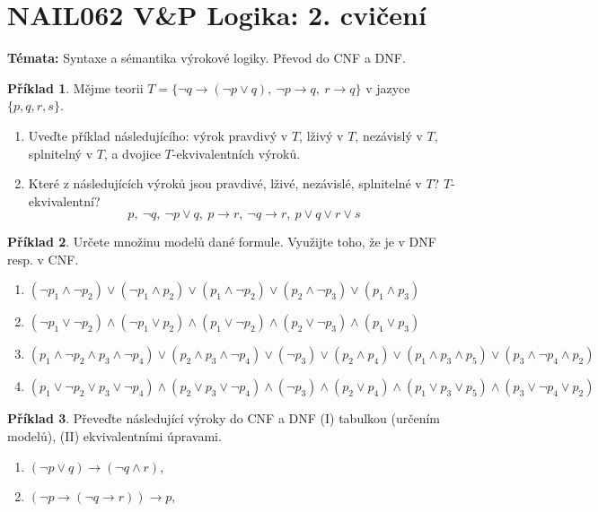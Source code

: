 \documentclass[a4paper]{article}
\theoremstyle{definition}
\newtheorem{problem}{Příklad}
\begin{document}
\section*{NAIL062 V\&P Logika: 2. cvičení}


\textbf{Témata:} 
Syntaxe a sémantika výrokové logiky. Převod do CNF a DNF.

\medskip\begin{problem}
    Mějme teorii $T=\{\neg q \to (\neg p \vee q),\ \neg p \to q,\ r \to q\}$ v jazyce $\{p, q, r, s\}$.
    \begin{enumerate}
        \item Uveďte příklad následujícího: výrok pravdivý v $T$, lživý v $T$, nezávislý v $T$, splnitelný v $T$, a dvojice $T$-ekvivalentních výroků.
        \item Které z následujících výroků jsou pravdivé, lživé, nezávislé, splnitelné v $T$? $T$-ekvivalentní? 
        $$
        p, \ \neg q, \ \neg p\vee q, \ p\to r,\ \neg q\to r, \ p\vee q\vee r\vee s
        $$
    \end{enumerate}
\end{problem}
    
    
\medskip\begin{problem} Určete množinu modelů dané formule. Využijte toho, že je v DNF resp. v CNF.
\begin{enumerate}
    \item $(\neg p_1 \wedge \neg p_2)\vee( \neg p_1 \wedge p_2)\vee( p_1 \wedge \neg p_2)\vee( p_2 \wedge \neg p_3)\vee( p_1 \wedge p_3)$
    \item $(\neg p_1 \vee \neg p_2)\wedge( \neg p_1 \vee p_2)\wedge( p_1 \vee \neg p_2)\wedge( p_2 \vee \neg p_3)\wedge( p_1 \vee p_3)$
    \item $(p_1 \wedge  \neg p_2 \wedge  p_3 \wedge  \neg p_4 )\vee(p_2 \wedge  p_3 \wedge  \neg p_4 )\vee(\neg p_3)\vee(p_2 \wedge  p_4)\vee(p_1 \wedge  p_3 \wedge  p_5 )\vee(p_3 \wedge  \neg p_4 \wedge  p_2 )$
    \item $(p_1 \vee \neg p_2 \vee p_3 \vee \neg p_4 )\wedge(p_2 \vee p_3 \vee \neg p_4 )\wedge(\neg p_3)\wedge(p_2 \vee p_4)\wedge(p_1 \vee p_3 \vee p_5 )\wedge(p_3 \vee \neg p_4 \vee p_2 )$
\end{enumerate}
\end{problem}
    
    
\medskip\begin{problem} Převeďte následující výroky do CNF a DNF (I) tabulkou (určením modelů), (II) ekvivalentními úpravami.
\begin{enumerate}
    \item $(\neg p \vee q)\to (\neg q \wedge r)$,
    \item $(\neg p \to (\neg q \to r))\to p$,
\end{enumerate}
\end{problem}
    
\end{document}
